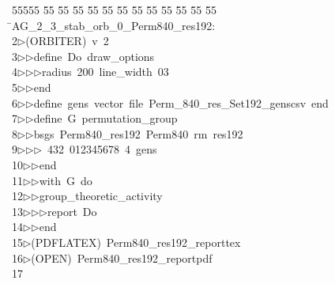 %
%
\begin{tabbing}
55555 \= 55 \= 55 \= 55 \= 55 \= 55 \= 55 \= 55 \= 55 \= 55 \= 55 \= 55 \= 55 \= \>AG\_2\_3\_stab\_orb\_0\_Perm840\_res192:\\[0pt]
2\>$\triangleright$\>(ORBITER)\ v\ 2\ \\[0pt]
3\>$\triangleright$\>$\triangleright$\>define\ Do\ draw\_options\ \\[0pt]
4\>$\triangleright$\>$\triangleright$\>$\triangleright$\>radius\ 200\ line\_width\ 03\ \\[0pt]
5\>$\triangleright$\>$\triangleright$\>end\ \\[0pt]
6\>$\triangleright$\>$\triangleright$\>define\ gens\ vector\ file\ Perm\_840\_res\_Set192\_genscsv\ end\ \\[0pt]
7\>$\triangleright$\>$\triangleright$\>define\ G\ permutation\_group\ \\[0pt]
8\>$\triangleright$\>$\triangleright$\>bsgs\ Perm840\_res192\ Perm840\ rm\ res192\ \\[0pt]
9\>$\triangleright$\>$\triangleright$\>$\triangleright$\ 432\ 012345678\ 4\ gens\ \\[0pt]
10\>$\triangleright$\>$\triangleright$\>end\ \\[0pt]
11\>$\triangleright$\>$\triangleright$\>with\ G\ do\ \\[0pt]
12\>$\triangleright$\>$\triangleright$\>group\_theoretic\_activity\ \\[0pt]
13\>$\triangleright$\>$\triangleright$\>$\triangleright$\>report\ Do\ \\[0pt]
14\>$\triangleright$\>$\triangleright$\>end\\[0pt]
15\>$\triangleright$\>(PDFLATEX)\ Perm840\_res192\_reporttex\\[0pt]
16\>$\triangleright$\>(OPEN)\ Perm840\_res192\_reportpdf\\[0pt]
17\>\end{tabbing}
